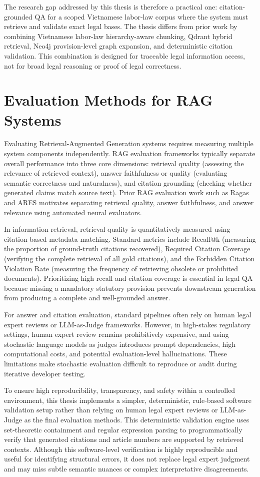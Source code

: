 The research gap addressed by this thesis is therefore a practical one: citation-grounded QA for a scoped Vietnamese labor-law corpus where the system must retrieve and validate exact legal bases. The thesis differs from prior work by combining Vietnamese labor-law hierarchy-aware chunking, Qdrant hybrid retrieval, Neo4j provision-level graph expansion, and deterministic citation validation. This combination is designed for traceable legal information access, not for broad legal reasoning or proof of legal correctness.

\section{Evaluation Methods for RAG Systems}
Evaluating Retrieval-Augmented Generation systems requires measuring multiple system components independently. RAG evaluation frameworks typically separate overall performance into three core dimensions: retrieval quality (assessing the relevance of retrieved context), answer faithfulness or quality (evaluating semantic correctness and naturalness), and citation grounding (checking whether generated claims match source text). Prior RAG evaluation work such as Ragas \cite{es2023ragas} and ARES \cite{saadfalcon2023ares} motivates separating retrieval quality, answer faithfulness, and answer relevance using automated neural evaluators.

In information retrieval, retrieval quality is quantitatively measured using citation-based metadata matching. Standard metrics include Recall@k (measuring the proportion of ground-truth citations recovered), Required Citation Coverage (verifying the complete retrieval of all gold citations), and the Forbidden Citation Violation Rate (measuring the frequency of retrieving obsolete or prohibited documents). Prioritizing high recall and citation coverage is essential in legal QA because missing a mandatory statutory provision prevents downstream generation from producing a complete and well-grounded answer.

For answer and citation evaluation, standard pipelines often rely on human legal expert reviews or LLM-as-Judge frameworks. However, in high-stakes regulatory settings, human expert review remains prohibitively expensive, and using stochastic language models as judges introduces prompt dependencies, high computational costs, and potential evaluation-level hallucinations. These limitations make stochastic evaluation difficult to reproduce or audit during iterative developer testing.

To ensure high reproducibility, transparency, and safety within a controlled environment, this thesis implements a simpler, deterministic, rule-based software validation setup rather than relying on human legal expert reviews or LLM-as-Judge as the final evaluation methods. This deterministic validation engine uses set-theoretic containment and regular expression parsing to programmatically verify that generated citations and article numbers are supported by retrieved contexts. Although this software-level verification is highly reproducible and useful for identifying structural errors, it does not replace legal expert judgment and may miss subtle semantic nuances or complex interpretative disagreements.

